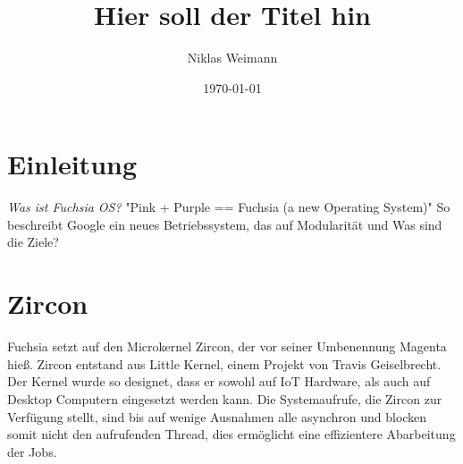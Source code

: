 \documentclass[a4paper]{scrartcl}
\begin{document}
\title{Hier soll der Titel hin}
\author{Niklas Weimann}
\date{\today}

\maketitle


\tableofcontents
\newpage



\section{Einleitung}
\textit{Was ist Fuchsia OS?}
"Pink + Purple == Fuchsia (a new Operating System)"\cite{GoogleLLC.} So beschreibt Google ein neues Betriebssystem, das auf Modularität und 
Was sind die Ziele?
\section{Zircon}
Fuchsia setzt auf den Microkernel Zircon, der vor seiner Umbenennung Magenta hieß. Zircon entstand aus Little Kernel, einem Projekt von Travis Geiselbrecht. Der Kernel wurde so designet, dass er sowohl auf IoT Hardware, als auch auf Desktop Computern eingesetzt werden kann. \cite{DaveAltavilla.30.Juni2019} Die Systemaufrufe, die Zircon zur Verfügung stellt, sind bis auf wenige Ausnahmen alle asynchron und blocken somit nicht den aufrufenden Thread, dies ermöglicht eine effizientere Abarbeitung der Jobs.
\end{document}
